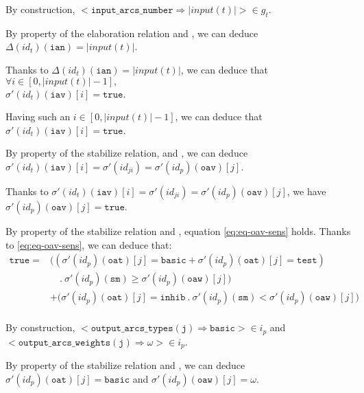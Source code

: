 \documentclass[dvipsnames,12pt]{article}
\begin{document}
\begin{niproof}
\begin{enumerate}
\begin{enumerate}
      \noindent{}By construction,
      ${<}\mathtt{input\_arcs\_number\Rightarrow{}}\vert{}input(t)\vert{>}\in{}g_t$.

      \noindent{}By property of the elaboration relation and
      \InCsCompT, we can deduce
      $\Delta(id_t)(\texttt{ian})=\vert{}input(t)\vert$.

      \noindent{}Thanks to $\Delta(id_t)(\texttt{ian})=\vert{}input(t)\vert$,
      we can deduce that
      $\forall{}i\in[0,\vert{}input(t)\vert-1],$\\
      $\sigma'(id_t)(\texttt{iav})[i]=\mathtt{true}$.

      \noindent{}Having such an $i\in[0,\vert{}input(t)\vert-1]$, we
      can deduce that $\sigma'(id_t)(\texttt{iav})[i]=\mathtt{true}$.

      \noindent{}By property of the stabilize relation, \InCsCompT{}
      and \InCsCompP, we can deduce
      $\sigma'(id_t)(\texttt{iav})[i]=\sigma'(id_{ji})=\sigma'(id_p)(\texttt{oav})[j]$.

      \noindent{}Thanks to
      $\sigma'(id_t)(\texttt{iav})[i]=\sigma'(id_{ji})=\sigma'(id_p)(\texttt{oav})[j]$,
      we have $\sigma'(id_p)(\texttt{oav})[j]=\mathtt{true}$.

      By property of the stabilize relation and \InCsCompP, equation
      \eqref{eq:eq-oav-sens} holds. Thanks to \eqref{eq:eq-oav-sens},
      we can deduce that:
      \begin{equation}
        \label{eq:sens-true}
        \begin{split}
          \mathtt{true}=& \big((\sigma'(id_p)(\texttt{oat})[j]=\mathtt{basic}+\sigma'(id_p)(\texttt{oat})[j]=\mathtt{test}) \\
          & \quad.~\sigma'(id_p)(\texttt{sm})\ge\sigma'(id_p)(\texttt{oaw})[j]\big)\\
          & +\big(\sigma'(id_p)(\texttt{oat})[j]=\mathtt{inhib}~.~\sigma'(id_p)(\texttt{sm})<\sigma'(id_p)(\texttt{oaw})[j]\big)\\
        \end{split}
      \end{equation}

      \noindent{}By construction,
      ${<}\mathtt{output\_arcs\_types(j)\Rightarrow{}basic}{>}\in{}i_p$
      and\\
      ${<}\mathtt{output\_arcs\_weights(j)\Rightarrow{}}\omega{>}\in{}i_p$.

      \noindent{}By property of the stabilize relation and \InCsCompP,
      we can deduce $\sigma'(id_p)(\texttt{oat})[j]=\mathtt{basic}$ and
      $\sigma'(id_p)(\texttt{oaw})[j]=\omega$.


\end{enumerate}
\end{enumerate}
\end{niproof}
\end{document}
